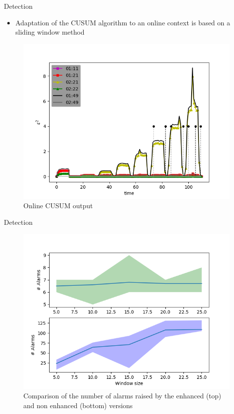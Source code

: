 \documentclass{beamer}
\begin{document}
\begin{frame}{Detection}
    \begin{itemize}
        \item Adaptation of the CUSUM algorithm to an online context is based on a sliding window
            method 
    \end{itemize}
    \pause
    \begin{figure}
        \includegraphics[width=.6\textwidth]{meter_eleph/detection_results_plotted}
        \caption{Online CUSUM output}
    \end{figure}
\end{frame}

\begin{frame}{Detection}
    \begin{figure}
        \includegraphics[width=.7\textwidth]{meter_eleph/evaluation_error}
        \caption{Comparison of the number of alarms raised by the enhanced (top) and non enhanced (bottom) versions}
    \end{figure}
\end{frame}
\end{document}
